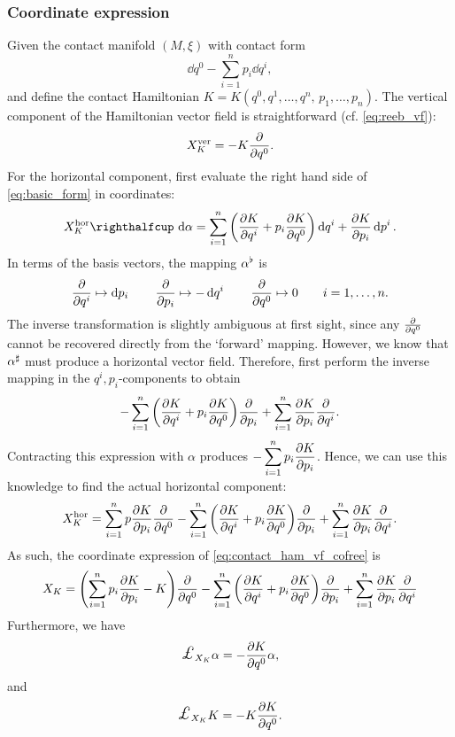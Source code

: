 \subsubsection{Coordinate expression} Given the contact manifold \((M, \xi)\) with contact form
\begin{equation}
     \dd{q^0} - \sum_{i = 1}^n p_i\dd{q^i},
\end{equation}
and define the contact Hamiltonian \(K = K(q^0, q^1, \ldots, q^n,\, p_1, \ldots, p_n)\). 
The vertical component of the Hamiltonian vector field is straightforward (cf. \cref{eq:reeb_vf}): 
\begin{equation}
     X_K^\text{ver} = -K\pdv{}{q^0}.
\end{equation}
For the horizontal component, first evaluate the right hand side of \cref{eq:basic_form} in coordinates:
\begin{equation}
     \intpr{X_K^\text{hor}}{\dd{\alpha}} =  \sum_{i = 1}^n \qty(\pdv{K}{q^i} + p_i \pdv{K}{q^0})\dd{q^i} + \pdv{K}{p_i}\dd{p^i}.
\end{equation}
In terms of the basis vectors, the mapping \(\alpha^\flat\) is
\begin{equation}
     \pdv{}{q^i} \mapsto \dd{p_i} \qquad \pdv{}{p_i} \mapsto -\dd{q^i} \qquad \pdv{}{q^0} \mapsto 0 \qquad i = 1, \ldots, n.
\end{equation}
The inverse transformation is slightly ambiguous at first sight, since any \(\pdv{}{q^0}\) cannot be recovered directly from the `forward' mapping. However, we know that \(\alpha^\sharp\) must produce a horizontal vector field. Therefore, first perform the inverse mapping in the \(q^i, p_i\)-components to obtain
\begin{equation}
     - \sum_{i = 1}^n \qty(\pdv{K}{q^i} + p_i \pdv{K}{q^0})\pdv{}{p_i} + \sum_{i=1}^n \pdv{K}{p_i}\pdv{}{q^i}.
\end{equation}
Contracting this expression with \(\alpha\) produces \(\displaystyle - \sum_{i=1}^n p_i\pdv{K}{p_i} \). Hence, we can use this knowledge to find the actual horizontal component:
\begin{equation}
     X_K^\text{hor} = \sum_{i=1}^n p\pdv{K}{p_i} \pdv{}{q^0}- \sum_{i = 1}^n \qty(\pdv{K}{q^i} + p_i \pdv{K}{q^0})\pdv{}{p_i} + \sum_{i=1}^n \pdv{K}{p_i}\pdv{}{q^i}.
\end{equation}
As such, the coordinate expression of \cref{eq:contact_ham_vf_cofree} is 
\begin{equation}
    X_K = \qty(\sum_{i=1}^n p_i\pdv{K}{p_i} - K) \pdv{}{q^0}- \sum_{i = 1}^n \qty(\pdv{K}{q^i} + p_i \pdv{K}{q^0})\pdv{}{p_i} + \sum_{i=1}^n \pdv{K}{p_i}\pdv{}{q^i}
\end{equation}
Furthermore, we have
\begin{equation}
     \lied{X_K} \alpha = - \pdv{K}{q^0} \alpha,
\end{equation} 
and 
\begin{equation}
     \lied{X_K} K = - K\pdv{K}{q^0}.
\end{equation} 

